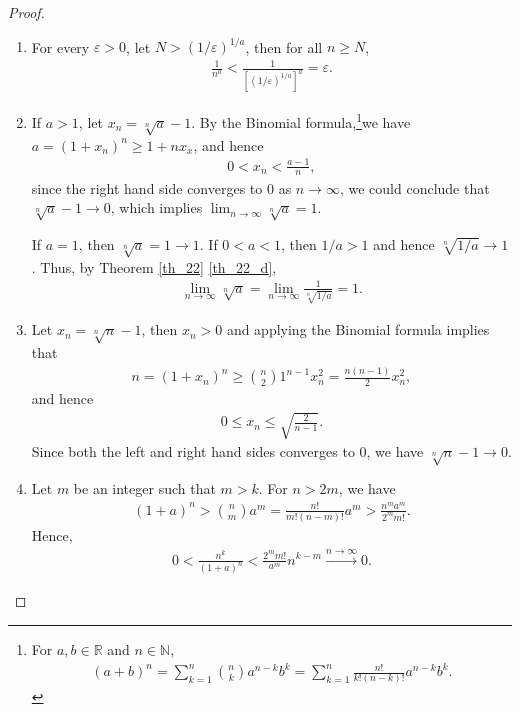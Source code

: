 \documentclass[11pt]{book}
\theoremstyle{definition}
\numberwithin{equation}{chapter}
\begin{document}
\begin{proof}
~\begin{enumerate}[label=(\alph*)]
    \item For every $\varepsilon > 0$, let $N > (1/\varepsilon)^{1/a}$, then for all $n \geq N$, 
    \begin{align*}
        \frac{1}{n^a} < \frac{1}{\left[(1/\varepsilon)^{1/a}\right]^a} = \varepsilon.
    \end{align*}
    
    \item If $a > 1$, let $x_n = \sqrt[n]{a} - 1$. By the Binomial formula,\footnote{For $a, b \in \mathbb{R}$ and $n \in \mathbb{N}$, \begin{align*}
    (a + b)^n = \sum^n_{k=1} \binom{n}{k} a^{n-k}b^{k} = \sum^n_{k=1} \frac{n!}{k!(n-k)!} a^{n-k}b^{k}.
    \end{align*}}we have $a = (1 + x_n)^n \geq 1 + nx_x$, and hence
    \begin{align*}
        0 < x_n < \frac{a - 1}{n},
    \end{align*}
    since the right hand side converges to $0$ as $n \to \infty$, we could conclude that $\sqrt[n]{a} - 1 \to 0$, which implies $\lim_{n\to\infty} \sqrt[n]{a} = 1$.

    If $a = 1$, then $\sqrt[n]{a} = 1 \to 1$. If $0 < a < 1$, then $1/a > 1$ and hence $\sqrt[n]{1/a} \to 1$. Thus, by Theorem \ref{th_22} \ref{th_22_d},
    \begin{align*}
        \lim_{n\to\infty} \sqrt[n]{a} = \lim_{n\to\infty} \frac{1}{\sqrt[n]{1/a}} = 1.
    \end{align*}
    
    \item Let $x_n = \sqrt[n]{n} - 1$, then $x_n > 0$ and applying the Binomial formula implies that 
    \begin{align*}
        n = (1 + x_n)^n \geq \binom{n}{2} 1^{n-1} x_n^2 = \frac{n(n-1)}{2} x_n^2,
    \end{align*}
    and hence
    \begin{align*}
        0 \leq x_n \leq \sqrt{\frac{2}{n-1}}.
    \end{align*}
    Since both the left and right hand sides converges to $0$, we have $\sqrt[n]{n} - 1 \to 0$.
    
    \item Let $m$ be an integer such that $m > k$. For $n > 2m$, we have
    \begin{align*}
        (1 + a)^n > \binom{n}{m}a^m = \frac{n!}{m!(n-m)!} a^m > \frac{n^m a^m}{2^m m!}.
    \end{align*}
    Hence, 
    \begin{align*}
        0 < \frac{n^k}{(1 + a)^n} < \frac{2^m m!}{a^m} n^{k - m} \xrightarrow[]{n\to\infty} 0.
    \end{align*}
    

\end{enumerate}
\end{proof}
\end{document}
